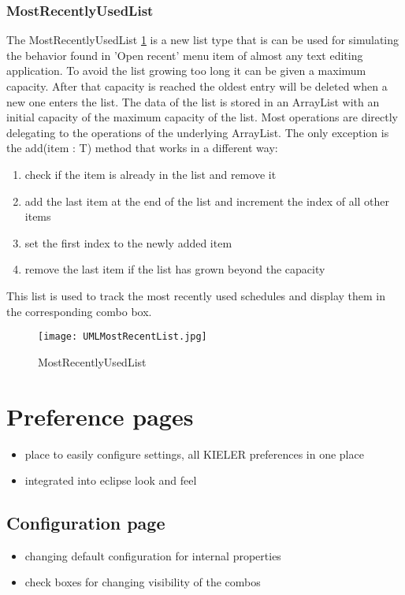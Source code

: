 \subsubsection*{MostRecentlyUsedList}
The MostRecentlyUsedList \ref{fig:MostRecentlyUsedList} is a new list type that is can be used for simulating the 
behavior found in 'Open recent' menu item of almost any text editing application.
To avoid the list growing too long it can be given a maximum capacity. After that capacity
is reached the oldest entry will be deleted when a new one enters the list.
The data of the list is stored in an ArrayList with an initial capacity of the maximum
capacity of the list. Most operations are directly delegating to the operations of the 
underlying ArrayList. 
The only exception is the add(item : T) method that works in a different way:
\begin{enumerate}
 \item check if the item is already in the list and remove it
 \item add the last item at the end of the list and increment the index of all other items
 \item set the first index to the newly added item 
 \item remove the last item if the list has grown beyond the capacity
\end{enumerate}
This list is used to track the most recently used schedules and display them
in the corresponding combo box.
\begin{figure}[MostRecentlyUsedList]
  \centering
  \texttt{[image: UMLMostRecentList.jpg]}
  \caption[MostRecentlyUsedList]%
  {MostRecentlyUsedList\protect}
  \label{fig:MostRecentlyUsedList}
\end{figure}

\section{Preference pages}
\begin{itemize}
 \item place to easily configure settings, all KIELER preferences in one place
 \item integrated into eclipse look and feel
\end{itemize}

\subsection{Configuration page}
\begin{itemize}
 \item changing default configuration for internal properties
 \item check boxes for changing visibility of the combos
\end{itemize}

